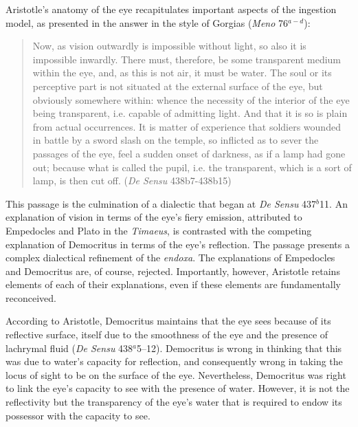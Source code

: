 Aristotle's anatomy of the eye recapitulates important aspects of the ingestion model, as presented in the answer in the style of Gorgias (\emph{Meno} 76\( ^{a-d} \)):
\begin{quote}
	Now, as vision outwardly is impossible without light, so also it is impossible inwardly. There must, therefore, be some transparent medium within the eye, and, as this is not air, it must be water. The soul or its perceptive part is not situated at the external surface of the eye, but obviously somewhere within: whence the necessity of the interior of the eye being transparent, i.e. capable of admitting light. And that it is so is plain from actual occurrences. It is matter of experience that soldiers wounded in battle by a sword slash on the temple, so inflicted as to sever the passages of the eye, feel a sudden onset of darkness, as if a lamp had gone out; because what is called the pupil, i.e. the transparent, which is a sort of lamp, is then cut off. (\emph{De Sensu} 438b7-438b15)
\end{quote}
This passage is the culmination of a dialectic that began at \emph{De Sensu} 437\( ^{b} \)11. An explanation of vision in terms of the eye's fiery emission, attributed to Empedocles and Plato in the \emph{Timaeus}, is contrasted with the competing explanation of Democritus in terms of the eye's reflection. The passage presents a complex dialectical refinement of the \emph{endoxa}. The explanations of Empedocles and Democritus are, of course, rejected. Importantly, however, Aristotle retains elements of each of their explanations, even if these elements are fundamentally reconceived.

According to Aristotle, Democritus maintains that the eye sees because of its reflective surface, itself due to the smoothness of the eye and the presence of lachrymal fluid (\emph{De Sensu} 438\( ^{a} \)5--12). Democritus is wrong in thinking that this was due to water's capacity for reflection, and consequently wrong in taking the locus of sight to be on the surface of the eye. Nevertheless, Democritus was right to link the eye's capacity to see with the presence of water. However, it is not the reflectivity but the transparency of the eye's water that is required to endow its possessor with the capacity to see. 


